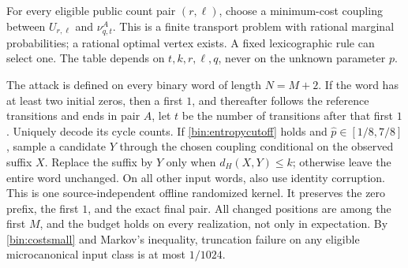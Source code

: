 For every eligible public count pair $(r,\ell)$, choose a minimum-cost coupling between $U_{r,\ell}$ and $\nu^A_{q,t}$. This is a finite transport problem with rational marginal probabilities; a rational optimal vertex exists. A fixed lexicographic rule can select one. The table depends on $t,k,r,\ell,q$, never on the unknown parameter $p$.

The attack is defined on every binary word of length $N=M+2$. If the word has at least two initial zeros, then a first $1$, and thereafter follows the reference transitions and ends in pair $A$, let $t$ be the number of transitions after that first $1$. Uniquely decode its cycle counts. If \eqref{bin:entropycutoff} holds and $\widehat p\in[1/8,7/8]$, sample a candidate $Y$ through the chosen coupling conditional on the observed suffix $X$. Replace the suffix by $Y$ only when $d_H(X,Y)\le k$; otherwise leave the entire word unchanged. On all other input words, also use identity corruption. This is one source-independent offline randomized kernel. It preserves the zero prefix, the first $1$, and the exact final pair. All changed positions are among the first $M$, and the budget holds on every realization, not only in expectation. By \eqref{bin:costsmall} and Markov's inequality, truncation failure on any eligible microcanonical input class is at most $1/1024$.

